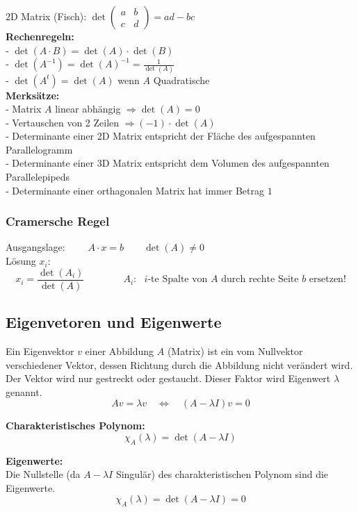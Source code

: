 2D Matrix (Fisch): \hspace{1cm} $\det \begin{pmatrix}a & b \\ c
& d \end{pmatrix} = a d - b c$\\

\textbf{Rechenregeln:}\\
- $\det(A \cdot B) = \det(A) \cdot \det(B)$\\
- $\det(A^{-1})=\det(A)^{-1}=\frac{1}{\det(A)}$\\
- $\det(A^t)=\det(A)$ wenn $A$ Quadratische \\

\textbf{Merksätze:}\\
- Matrix $A$ linear abhängig $\Rightarrow \det(A)=0$\\
- Vertauschen von 2 Zeilen $\Rightarrow (-1)\cdot \det(A)$\\
- Determinante einer 2D Matrix entspricht der Fläche des aufgespannten
Parallelogramm\\
- Determinante einer 3D Matrix entspricht dem Volumen des aufgespannten
Parallelepipeds\\
- Determinante einer orthagonalen Matrix hat immer Betrag $1$

\subsubsection{Cramersche Regel}
Ausgangslage: $\qquad A \cdot x = b \qquad \det(A)\neq 0$\\
Lösung $x_i$:
\[
	x_i=\frac{\det(A_i)}{\det(A)} \qquad \qquad A_i:\text{ $i$-te Spalte von $A$  durch rechte Seite  $b$ ersetzen!}
\]


\subsection{Eigenvetoren und Eigenwerte}
Ein Eigenvektor $v$ einer Abbildung $A$ (Matrix) ist ein vom Nullvektor
verschiedener Vektor, dessen Richtung durch die Abbildung nicht verändert wird. Der Vektor wird nur
gestreckt oder gestaucht. Dieser Faktor wird Eigenwert $\lambda$ genannt.
\[
	A v = \lambda v \quad \Leftrightarrow \quad (A-\lambda I)v=0
\]

\textbf{Charakteristisches Polynom:}\\
\[
	\chi_A(\lambda)=\det(A-\lambda I)
\]

\textbf{Eigenwerte:}\\
Die Nullstelle (da $A-\lambda I$ Singulär) des charakteristischen Polynom sind
die Eigenwerte. 
\[
	\chi_A(\lambda)=\det(A-\lambda I)=0
\]

